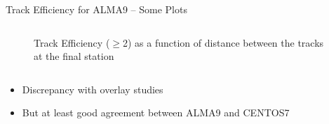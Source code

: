\begin{frame}{Track Efficiency for ALMA9  -- Some Plots}
\begin{columns}
\begin{column}{0.5 \textwidth}
\begin{figure}
                \caption{Track Efficiency ($\geq$2) as a function of distance between the tracks at the final station}
            \end{figure}
        \end{column}
    \end{columns}
    \begin{itemize}
        \item Discrepancy  with overlay studies
        \item But at least good agreement between ALMA9 and CENTOS7
    \end{itemize}
\end{frame}